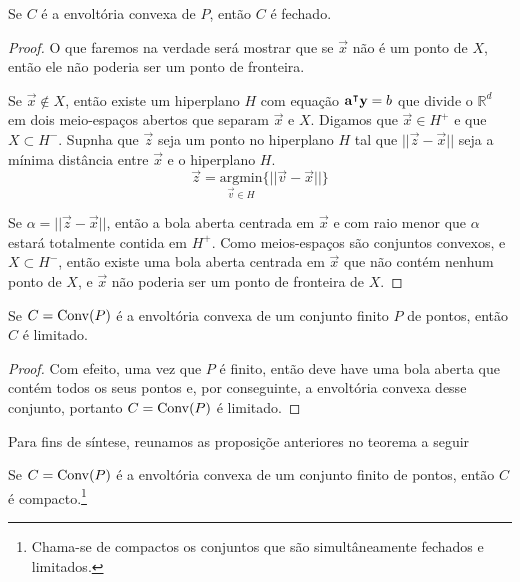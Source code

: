 \begin{prop:conjuntos convexos fechados}
Se $C$ é a envoltória convexa de $P$, então $C$ é fechado.
  \begin{proof}
    O que faremos na verdade será mostrar que se $\vec x$ não é um ponto de $X$,
    então ele não poderia ser um ponto de fronteira.

    Se $\vec x \notin X$, então existe um hiperplano $H$ com
    equação $\mathbf{a}^\intercal \mathbf y = b$ que divide
    o $\mathbb{R}^d$ em dois meio-espaços abertos que separam
    $\vec x$ e $X$. Digamos que $\vec x \in H^+$ e que $X \subset H^-$.
    Supnha que $\vec z$ seja um ponto no hiperplano $H$ tal que
    $|| \vec z - \vec x ||$ seja a mínima distância entre $\vec x$
    e o hiperplano $H$.
    \[
      \vec z = \underset{\vec v \in H}{\mathrm{argmin}}\{|| \vec v - \vec x ||\}
    \]

    Se $\alpha = || \vec z - \vec x ||$,
    então a bola aberta centrada em $\vec x$
    e com raio menor que $\alpha$ estará totalmente contida em
    $H^+$. Como meios-espaços são conjuntos convexos, e $X \subset H^-$,
    então existe uma bola aberta centrada em $\vec x$ que não
    contém nenhum ponto de $X$, e $\vec x$ não poderia ser
    um ponto de fronteira de $X$.
  \end{proof}
\end{prop:conjuntos convexos fechados}

\begin{prop:conjuntos convexos limitados}
  Se $C = \mathrm{Conv}(P)$ é a envoltória convexa de um conjunto finito $P$ de pontos,
  então $C$ é limitado.

  \begin{proof}
   Com efeito, uma vez que $P$ é finito, então deve have uma bola aberta que
   contém todos os seus pontos e, por conseguinte, a envoltória convexa desse
   conjunto, portanto $C = \mathrm{Conv}(P)$ é limitado.
  \end{proof}
\end{prop:conjuntos convexos limitados}

Para fins de síntese, reunamos as proposiçõe anteriores no teorema a seguir

\begin{thm:conjuntos convexos compactos}
  Se $C = \mathrm{Conv}(P)$ é a envoltória convexa de um conjunto finito de pontos,
  então $C$ é compacto.\footnote{Chama-se de compactos os conjuntos que são
  simultâneamente fechados e limitados.}
\end{thm:conjuntos convexos compactos}

